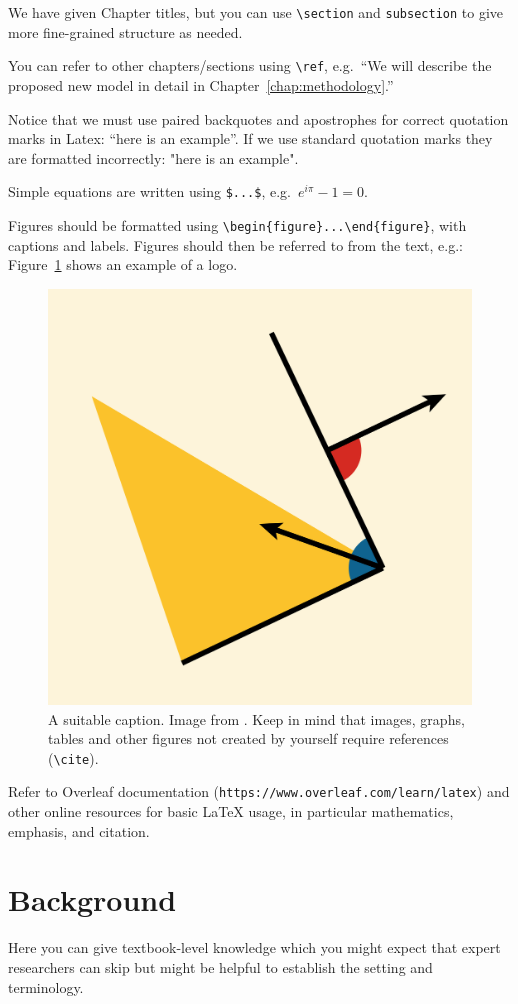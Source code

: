 \documentclass[a4paper,12pt]{Classes/RoboticsLaTeX}
\begin{document}
	We have given Chapter titles, but you can use \verb+\section+ and \verb+subsection+ to give more fine-grained structure as needed.
	
	You can refer to other chapters/sections using \verb+\ref+, e.g.~``We will describe the proposed new model in detail in Chapter~\ref{chap:methodology}.''
	
	Notice that we must use paired backquotes and apostrophes for correct quotation marks in Latex: ``here is an example''. If we use standard quotation marks they are formatted incorrectly: "here is an example".
	
	Simple equations are written using \verb+$...$+, e.g.~$e^{i\pi} - 1 = 0$.
	
	Figures should be formatted using \verb+\begin{figure}...\end{figure}+, with captions and labels. Figures should then be referred to from the text, e.g.: Figure~\ref{fig:penrose} shows an example of a logo.
	\begin{figure}
		\centering
		\includegraphics[width=0.3\linewidth]{Figures/penrose.png}
		\caption{A suitable caption. Image from \cite{10.1145/3386569.3392375}. Keep in mind that images, graphs, tables and other figures not created by yourself require references (\texttt{\textbackslash cite}).}
		\label{fig:penrose}
	\end{figure}
	
	\vspace{2ex} Refer to Overleaf documentation (\verb#https://www.overleaf.com/learn/latex#) and other online resources for basic LaTeX usage, in particular mathematics, emphasis, and citation.
	
	
	\chapter{Background}
	\label{chap:backg}
	
	Here you can give textbook-level knowledge which you might expect that expert researchers can skip but might be helpful to establish the setting and terminology. 
	
\end{document}
